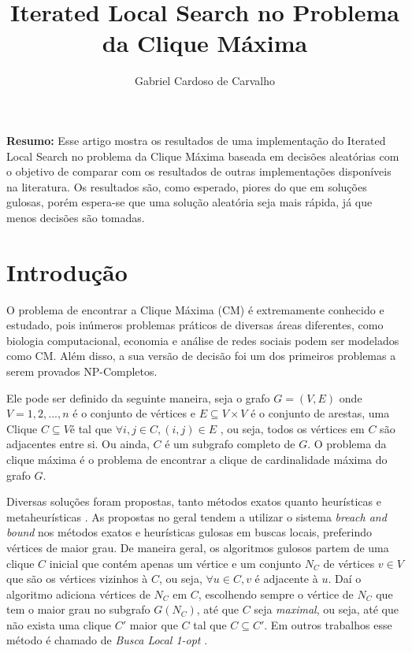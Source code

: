 \documentclass{article}
\title{Iterated Local Search no Problema da Clique Máxima}
\author{Gabriel Cardoso de Carvalho}
\date{}
\begin{document}
\maketitle

\textbf{Resumo:} Esse artigo mostra os resultados de uma implementação do Iterated Local Search no problema da Clique Máxima baseada em decisões aleatórias com o objetivo de comparar com os resultados de outras implementações disponíveis na literatura. Os resultados são, como esperado, piores do que em soluções gulosas, porém espera-se que uma solução aleatória seja mais rápida, já que menos decisões são tomadas.

\section{Introdução}

O problema de encontrar a Clique Máxima (CM) é extremamente conhecido e estudado, pois inúmeros problemas práticos de diversas áreas diferentes, como biologia computacional, economia e análise de redes sociais podem ser modelados como CM. 
Além disso, a sua versão de decisão foi um dos primeiros problemas a serem provados NP-Completos.\par 

Ele pode ser definido da seguinte maneira, seja o grafo $G=(V,E)$ onde $V = 1,2, ... , n$ é o conjunto de vértices e $E \subseteq V \times V$ é o conjunto de arestas, uma Clique $C \subseteq V $é tal que $\forall i,j \in C, (i,j) \in E$ 
, ou seja, todos os vértices em $C$ são adjacentes entre si. Ou ainda, $C$ é um subgrafo completo de $G$. O problema da clique máxima é o problema de encontrar a clique de cardinalidade máxima do grafo $G$.\par

Diversas soluções foram propostas, tanto métodos exatos quanto heurísticas e metaheurísticas \cite{review,pardaloshand,DIMACS2}. As propostas no geral tendem a utilizar o sistema \textit{breach and bound} nos métodos exatos e heurísticas gulosas em buscas locais, preferindo vértices de maior grau. De maneira geral, os algoritmos gulosos partem de uma clique $C$ inicial que contém apenas um vértice e um conjunto $N_C$ de vértices $v \in V$ que são os vértices vizinhos à $C$, ou seja, $\forall u \in C, v$ é adjacente à $u$. Daí o algoritmo adiciona vértices de  $N_C$ em $C$, escolhendo sempre o vértice de $N_C$ que tem o maior grau no subgrafo $G(N_C)$, até que $C$ seja \textit{maximal}, ou seja, até que não exista uma clique $C'$ maior que $C$ tal que $C \subseteq C'$. Em outros trabalhos esse método é chamado de \textit{Busca Local 1-opt } \cite{KLS}.\par
\end{document}
